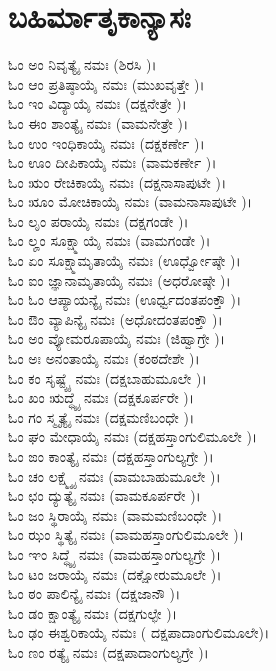 \section{ಬಹಿರ್ಮಾತೃಕಾನ್ಯಾಸಃ }
ಓಂ ಅಂ ನಿವೃತ್ಯೈ ನಮಃ (ಶಿರಸಿ )।\\
ಓಂ ಆಂ ಪ್ರತಿಷ್ಠಾಯೈ ನಮಃ (ಮುಖವೃತ್ತೇ )।\\
ಓಂ ಇಂ ವಿದ್ಯಾಯೈ ನಮಃ (ದಕ್ಷನೇತ್ರೇ )।\\
ಓಂ ಈಂ ಶಾಂತ್ಯೈ ನಮಃ (ವಾಮನೇತ್ರೇ )।\\
ಓಂ ಉಂ ಇಂಧಿಕಾಯೈ ನಮಃ (ದಕ್ಷಕರ್ಣೇ )।\\
ಓಂ ಊಂ ದೀಪಿಕಾಯೈ ನಮಃ (ವಾಮಕರ್ಣೇ )।\\
ಓಂ ಋಂ ರೇಚಿಕಾಯೈ ನಮಃ (ದಕ್ಷನಾಸಾಪುಟೇ )।\\
ಓಂ ೠಂ ಮೋಚಿಕಾಯೈ ನಮಃ (ವಾಮನಾಸಾಪುಟೇ )।\\
ಓಂ ಲೃಂ ಪರಾಯೈ ನಮಃ (ದಕ್ಷಗಂಡೇ )।\\
ಓಂ ಲೄಂ ಸೂಕ್ಷ್ಮಾಯೈ ನಮಃ (ವಾಮಗಂಡೇ )।\\
ಓಂ ಏಂ ಸೂಕ್ಷ್ಮಾಮೃತಾಯೈ ನಮಃ (ಊರ್ಧ್ವೋಷ್ಠೇ )।\\
ಓಂ ಐಂ ಜ್ಞಾನಾಮೃತಾಯೈ ನಮಃ (ಅಧರೋಷ್ಠೇ )।\\
ಓಂ ಓಂ ಆಪ್ಯಾಯನ್ಯೈ ನಮಃ (ಊರ್ಧ್ವದಂತಪಂಕ್ತೌ )।\\
ಓಂ ಔಂ ವ್ಯಾಪಿನ್ಯೈ ನಮಃ (ಅಧೋದಂತಪಂಕ್ತೌ )।\\
ಓಂ ಅಂ ವ್ಯೋಮರೂಪಾಯೈ ನಮಃ (ಜಿಹ್ವಾಗ್ರೇ )।\\
ಓಂ ಅಃ ಅನಂತಾಯೈ ನಮಃ (ಕಂಠದೇಶೇ )।\\
ಓಂ ಕಂ ಸೃಷ್ಟ್ಯೈ ನಮಃ (ದಕ್ಷಬಾಹುಮೂಲೇ )।\\
ಓಂ ಖಂ ಋದ್ಧ್ಯೈ ನಮಃ (ದಕ್ಷಕೂರ್ಪರೇ )।\\
ಓಂ ಗಂ ಸ್ಮೃತ್ಯೈ ನಮಃ (ದಕ್ಷಮಣಿಬಂಧೇ )।\\
ಓಂ ಘಂ ಮೇಧಾಯೈ ನಮಃ (ದಕ್ಷಹಸ್ತಾಂಗುಲಿಮೂಲೇ )।\\
ಓಂ ಙಂ ಕಾಂತ್ಯೈ ನಮಃ (ದಕ್ಷಹಸ್ತಾಂಗುಲ್ಯಗ್ರೇ )।\\
ಓಂ ಚಂ ಲಕ್ಷ್ಮ್ಯೈ ನಮಃ (ವಾಮಬಾಹುಮೂಲೇ )।\\
ಓಂ ಛಂ ದ್ಯುತ್ಯೈ ನಮಃ (ವಾಮಕೂರ್ಪರೇ )।\\
ಓಂ ಜಂ ಸ್ಥಿರಾಯೈ ನಮಃ (ವಾಮಮಣಿಬಂಧೇ )।\\
ಓಂ ಝಂ ಸ್ಥಿತ್ಯೈ ನಮಃ (ವಾಮಹಸ್ತಾಂಗುಲಿಮೂಲೇ )।\\
ಓಂ ಞಂ ಸಿದ್ಧ್ಯೈ ನಮಃ (ವಾಮಹಸ್ತಾಂಗುಲ್ಯಗ್ರೇ )।\\
ಓಂ ಟಂ ಜರಾಯೈ ನಮಃ (ದಕ್ಷೋರುಮೂಲೇ )।\\
ಓಂ ಠಂ ಪಾಲಿನ್ಯೈ ನಮಃ (ದಕ್ಷಜಾನೌ )।\\
ಓಂ ಡಂ ಕ್ಷಾಂತ್ಯೈ ನಮಃ (ದಕ್ಷಗುಲ್ಫೇ )।\\
ಓಂ ಢಂ ಈಶ್ವರಿಕಾಯೈ ನಮಃ ( ದಕ್ಷಪಾದಾಂಗುಲಿಮೂಲೇ)।\\
ಓಂ ಣಂ ರತ್ಯೈ ನಮಃ (ದಕ್ಷಪಾದಾಂಗುಲ್ಯಗ್ರೇ )।\\
